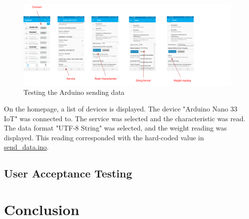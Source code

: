 \documentclass[class=report,11pt,crop=false]{standalone}
\begin{document}
		\begin{figure}[h!]
			\centering
			\includegraphics[width=1.2\linewidth]{"Figures/Screenshots of testing BLE posting"}
			\caption{Testing the Arduino sending data}
			\label{fig:screenshots-of-testing-ble-posting}
		\end{figure}
	
		On the homepage, a list of devices is displayed. The device "Arduino Nano 33 IoT" was connected to. The service was selected and the characteristic was read. The data format "UTF-8 String" was selected, and the weight reading was displayed. This reading corresponded with the hard-coded value in \href{https://github.com/karanimaan/EEE4113F-Project--Group-26/blob/main/send_data/send_data.ino}{send\_data.ino}.

	
	\subsection{User Acceptance Testing}
	
	\section{Conclusion}
	
	\ifstandalone
	
	\printnoidxglossary[type=\acronymtype,nonumberlist]
	\fi
\end{document}

